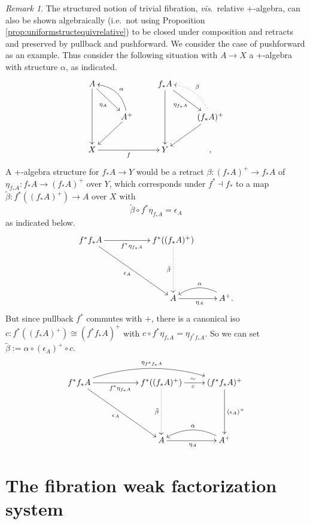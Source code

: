\documentclass[11pt,reqno]{amsart}
\renewcommand{\to}{\ensuremath{\rightarrow}}
\theoremstyle{remark}
\newtheorem{remark}[theorem]{Remark}
\theoremstyle{definition}
\begin{document}
\begin{remark}\label{trivfibpushforward}
The structured notion of trivial fibration, \emph{vis}.\ relative +-algebra, can also be shown algebraically (i.e.\ not using Proposition \ref{prop:uniformstructequivrelative}) to be closed under composition and retracts and preserved by pullback and pushforward. We consider  the case of pushforward as an example.   
Thus consider the following situation with $A\to X$ a +-algebra with structure $\alpha$, as indicated.
\begin{equation}\label{diagram:pushforwardplusalgebras}
\xymatrix{
A \ar[rd]_{\eta_A} \ar[dd]  && f_*A \ar[rd]_{\eta_{f_*A}} \ar[dd] & \\
& A^+ \ar[ld] \ar@/_3ex/ [ul]_\alpha && (f_*A)^+ \ar[ld]  \ar@{.>}@/_3ex/ [ul]_\beta \\
X \ar[rr]_{f} && Y &,
}
\end{equation}
A +-algebra structure for $f_*A \to Y$ would be a retract $\beta : (f_*A)^+ \to f_*A$ of $\eta_{f_*A} : f_*A \to (f_*A)^+$ over $Y$, which corresponds under $f^*\dashv f_*$ to a map $\tilde\beta : f^*((f_*A)^+) \to A$ over $X$ with 
\[
\tilde\beta \circ f^*\eta_{f_*A} = \epsilon_A
\]
as indicated below.
\begin{equation}\label{diagram:pushforwardplusalgebras2}
\xymatrix{
f^*f_*A \ar[rrdd]_{\epsilon_A} \ar[rr]_{f^*\eta_{f_*A}} 
	&&  f^*((f_*A)^+)  \ar@{.>}[dd]_{\tilde\beta} \\
&&\\
&& A \ar[r]_{\eta_A} & \ar@/_3ex/ [l]_\alpha A^+ .
}
\end{equation}
But since pullback $f^*$ commutes with $+$, there is a canonical iso $c : f^*((f_*A)^+)  \cong (f^*f_*A)^+$ with $ c\circ f^*\eta_{f_*A} = \eta_{f^*f_*A} $. So we can set $\tilde\beta := \alpha\circ(\epsilon_A)^+\circ c$.
\begin{equation}\label{diagram:pushforwardplusalgebras3}
\xymatrix{
f^*f_*A \ar[rrdd]_{\epsilon_A} \ar[rr]_{f^*\eta_{f_*A}}  \ar@/^4ex/ [rrr]^{\eta_{f^*f_*A}} 
	&&  f^*((f_*A)^+)  \ar@{.>}[dd]_{\tilde\beta} \ar[r]^{\sim}_{c}  & (f^*f_*A)^+  \ar[dd]^{(\epsilon_A)^+} \\
&&&\\
&& A \ar[r]_{\eta_{A}} & \ar@/_3ex/ [l]_\alpha A^+ 
}
\end{equation}
\end{remark}

\section{The fibration weak factorization system}\label{sec:fibrations}
\end{document}
